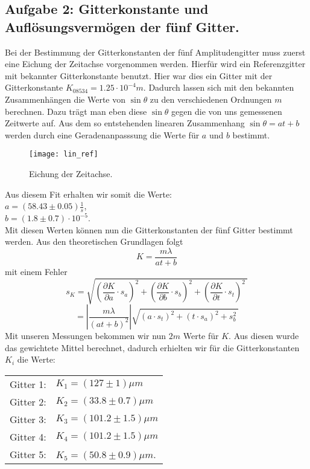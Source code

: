 \subsection{Aufgabe 2: Gitterkonstante und Auflösungsvermögen der fünf Gitter.}
Bei der Bestimmung der Gitterkonstanten der fünf Amplitudengitter muss zuerst eine Eichung der Zeitachse vorgenommen werden. Hierfür wird ein Referenzgitter mit bekannter Gitterkonstante benutzt. Hier war dies ein Gitter mit der Gitterkonstante $K_{08534}=1.25 \cdot 10^{-4}m$. Dadurch lassen sich mit den bekannten Zusammenhängen die Werte von $\sin \theta $ zu den verschiedenen Ordnungen $m$ berechnen. Dazu trägt man eben diese $\sin \theta$ gegen die von uns gemessenen Zeitwerte auf. Aus dem so entstehenden linearen Zusammenhang $\sin \theta = at + b$ werden durch eine Geradenanpasssung die Werte für $a$ und $b$ bestimmt.
\newpage
\begin{figure}[h]
\begin{center}
\texttt{[image: lin\_ref]}
\caption{Eichung der Zeitachse.}
\label{fig:lin_ref}
\end{center}
\end{figure}
\noindent
Aus diesem Fit erhalten wir somit die Werte:\\
$a=(58.43 \pm 0.05) \frac{1}{s}$,\\
$b=(1.8 \pm 0.7)\cdot 10^{-5}$.\\
Mit diesen Werten können nun die Gitterkonstanten der fünf Gitter bestimmt werden. Aus den theoretischen Grundlagen folgt
\[ K=\frac{m \lambda}{at+b}\]
mit einem Fehler
\[ s_K= \sqrt{\left( \frac{\partial K}{\partial a} \cdot s_a \right)^2+\left( \frac{\partial K}{\partial b} \cdot s_b \right)^2+\left( \frac{\partial K}{\partial t} \cdot s_t \right)^2 ~} \]
\[ = \left| \frac{m \lambda}{(at+b)^2} \right| \sqrt{(a\cdot s_t)^2+(t \cdot s_a)^2 + s_b^2~} \]
Mit unseren Messungen bekommen wir nun $2m$ Werte für $K$. Aus diesen wurde das gewichtete Mittel berechnet, dadurch erhielten wir für die Gitterkonstanten $K_i$ die Werte:
\begin{center}
\begin{tabular}{ll}
Gitter 1: & $K_1=(127 \pm 1)\mu m$\\
Gitter 2: & $K_2=(33.8 \pm 0.7) \mu m$\\
Gitter 3: & $K_3=(101.2 \pm 1.5) \mu m$\\
Gitter 4: & $K_4=(101.2 \pm 1.5) \mu m$\\
Gitter 5: & $K_5=(50.8 \pm 0.9) \mu m$.\\
\end{tabular}
\end{center}
